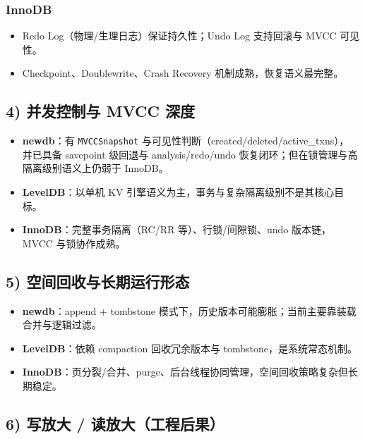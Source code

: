 \subsubsection{InnoDB}
\begin{itemize}
  \item Redo Log（物理/生理日志）保证持久性；Undo Log 支持回滚与 MVCC 可见性。
  \item Checkpoint、Doublewrite、Crash Recovery 机制成熟，恢复语义最完整。
\end{itemize}

\subsection{4) 并发控制与 MVCC 深度}

\begin{itemize}
  \item \textbf{newdb}：有 \texttt{MVCCSnapshot} 与可见性判断（created/deleted/active\_txns），
    并已具备 savepoint 级回退与 analysis/redo/undo 恢复闭环；但在锁管理与高隔离级别语义上仍弱于 InnoDB。
  \item \textbf{LevelDB}：以单机 KV 引擎语义为主，事务与复杂隔离级别不是其核心目标。
  \item \textbf{InnoDB}：完整事务隔离（RC/RR 等）、行锁/间隙锁、undo 版本链，MVCC 与锁协作成熟。
\end{itemize}

\subsection{5) 空间回收与长期运行形态}

\begin{itemize}
  \item \textbf{newdb}：append + tombstone 模式下，历史版本可能膨胀；当前主要靠装载合并与逻辑过滤。
  \item \textbf{LevelDB}：依赖 compaction 回收冗余版本与 tombstone，是系统常态机制。
  \item \textbf{InnoDB}：页分裂/合并、purge、后台线程协同管理，空间回收策略复杂但长期稳定。
\end{itemize}

\subsection{6) 写放大 / 读放大（工程后果）}

